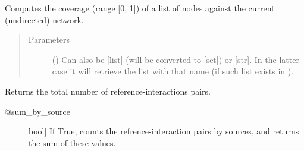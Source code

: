 \documentclass[letterpaper,10pt,english]{sphinxmanual}
\begin{document}
\begin{fulllineitems}
\begin{fulllineitems}
\begin{quote}
\begin{description}
\end{description}\end{quote}

\end{fulllineitems}


\begin{fulllineitems}
\label{\detokenize{reference:pypath.main.PyPath.coverage}}
Computes the coverage (range {[}0, 1{]}) of a list of nodes against
the current (undirected) network.
\begin{quote}\begin{description}
\item[{Parameters}] \leavevmode
{} () \textendash{} Can also be {[}list{]} (will be converted to {[}set{]}) or {[}str{]}. In
the latter case it will retrieve the list with that name (if
such list exists in ).

\end{description}\end{quote}

\end{fulllineitems}


\begin{fulllineitems}
\label{\detokenize{reference:pypath.main.PyPath.curation_effort}}
Returns the total number of reference-interactions pairs.
\begin{description}
\item[{@sum\_by\_source}] \leavevmode{[}bool{]}
If True, counts the refrence-interaction pairs by
sources, and returns the sum of these values.

\end{description}

\end{fulllineitems}



\end{fulllineitems}
\end{document}
